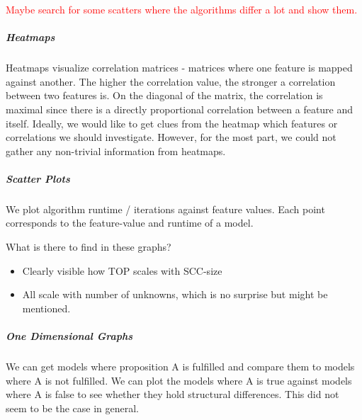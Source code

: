 \textcolor{red}{Maybe search for some scatters where the algorithms differ a lot and show them.}

\subparagraph*{Heatmaps}
Heatmaps visualize correlation matrices - matrices where one feature is mapped against another. The higher the correlation value, the stronger
a correlation between two features is. On the diagonal of the matrix, the correlation is maximal since there is a directly proportional correlation between
a feature and itself. Ideally, we would like to get clues from the heatmap which features or correlations we should investigate.
However, for the most part, we could not gather any non-trivial information from heatmaps.

\subparagraph*{Scatter Plots}
We plot algorithm runtime / iterations against feature values. Each point corresponds to the feature-value and runtime of a model.

What is there to find in these graphs?
\begin{itemize}
    \item Clearly visible how TOP scales with SCC-size
    \item All scale with number of unknowns, which is no surprise but might be mentioned.
\end{itemize}

\subparagraph*{One Dimensional Graphs}
We can get models where proposition A is fulfilled and compare them to models where A is not fulfilled.
We can plot the models where A is true against models where A is false to see whether they hold structural differences.
This did not seem to be the case in general.